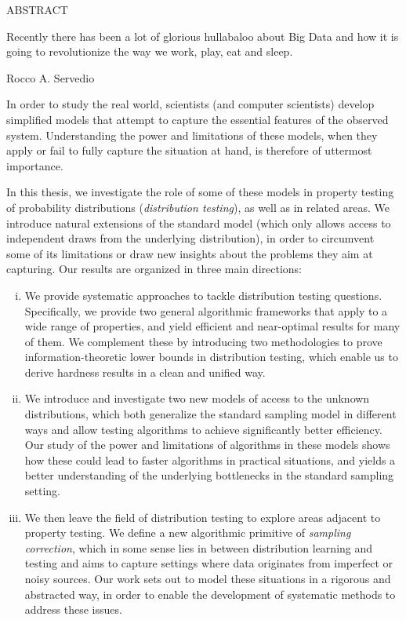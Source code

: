 
\pagestyle{empty} %
\begin{center}
  ABSTRACT

  \@title

  \@author
\end{center}

\epigraph{Recently there has been a lot of glorious hullabaloo about Big Data and how it is going to revolutionize the way we work, play, eat and sleep.}{Rocco A. Servedio}

In order to study the real world, scientists (and computer scientists) develop simplified models that attempt to capture the essential features of the observed system.
Understanding the power and limitations of these models, when they apply or fail to fully capture the situation at hand, is therefore of uttermost importance.

In this thesis, we investigate the role of some of these models in property testing of probability distributions (\emph{distribution testing}), as well as in related areas. We introduce natural extensions of the standard
model (which only allows access to independent draws from the underlying distribution), in order to circumvent some of its limitations or draw new insights about the
problems they aim at capturing. Our results are organized in three main directions:

\begin{enumerate}[(i)]
  \item We provide systematic approaches to tackle distribution testing questions. Specifically, we provide two general algorithmic frameworks that apply to a wide range of properties, and yield efficient and near-optimal results for many of them. We complement these by introducing two methodologies to prove information-theoretic lower bounds in distribution testing, which enable us to derive hardness results in a clean and unified way.
  
  \item We introduce and investigate two new models of access to the unknown distributions, which both generalize the standard sampling model in different ways and allow testing algorithms to achieve significantly better efficiency. Our study of the power and limitations of algorithms in these models shows how these could lead to faster algorithms in practical situations, and  yields a better understanding of the underlying bottlenecks in the standard sampling setting.

  \item We then leave the field of distribution testing to explore areas adjacent to property testing. We define a new algorithmic primitive of \emph{sampling correction}, which in some sense lies in between distribution learning and testing and aims to capture settings where data originates from imperfect or noisy sources. Our work sets out to model these situations in a rigorous and abstracted way, in order to enable the development of systematic methods to address these issues.
\end{enumerate}
